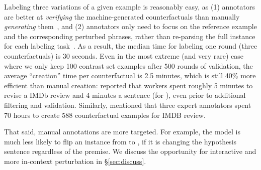 
Labeling three variations of a given example is reasonably easy, as (1) annotators are better at \emph{verifying} the machine-generated counterfactuals than manually \emph{generating} them~\cite{ribeiro2018sear}, and (2) annotators only need to focus on the reference example and the corresponding perturbed phrases, rather than re-parsing the full instance for each labeling task~\cite{Khashabi2020MoreBF}.
As a result, the median time for labeling one round (three counterfactuals) is 30 seconds.
Even in the most extreme (and very rare) case where we only keep 100 contrast set examples after 500 rounds of validation, the average ``creation'' time per counterfactual is 2.5 minutes, which is still 40\% more efficient than manual creation:
\citet{kaushik2019learning} reported that workers spent roughly 5 minutes to revise a IMDb review and 4 minutes a sentence (for \nli), even prior to additional filtering and validation.
Similarly, \citet{gardner2020contrast} mentioned that three expert annotators spent 70 hours to create 588 counterfactual examples for IMDB review.



That said, manual annotations are more targeted. 
For example, the model is much less likely to flip an \nli instance from  to , if it is changing the hypothesis sentence regardless of the premise.
We discuss the opportunity for interactive and more in-context perturbation in \S\ref{sec:discuss}.


